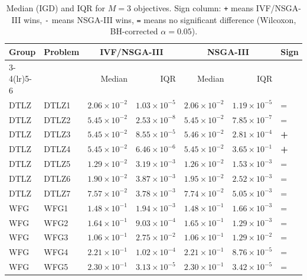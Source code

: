 \begin{table}[t]
\centering
\caption{Median (IGD) and IQR for $M=3$ objectives. Sign column: \texttt{+} means IVF/NSGA-III wins, \texttt{-} means NSGA-III wins, \texttt{=} means no significant difference (Wilcoxon, BH-corrected $\alpha=0.05$).}
\label{tab:igd_m3_ivfnsgaiii}
\scriptsize
\begin{tabular}{llrrrrl}
\toprule
Group & Problem & \multicolumn{2}{c}{IVF/NSGA-III} & \multicolumn{2}{c}{NSGA-III} & Sign \\
\cmidrule(lr){3-4}\cmidrule(lr){5-6}
 & & Median & IQR & Median & IQR & \\
\midrule
DTLZ & DTLZ1 & $2.06\!\times\!10^{-2}$ & $1.03\!\times\!10^{-5}$ & $2.06\!\times\!10^{-2}$ & $1.19\!\times\!10^{-5}$ & = \\
DTLZ & DTLZ2 & $5.45\!\times\!10^{-2}$ & $2.53\!\times\!10^{-8}$ & $5.45\!\times\!10^{-2}$ & $7.85\!\times\!10^{-7}$ & = \\
DTLZ & DTLZ3 & $5.45\!\times\!10^{-2}$ & $8.55\!\times\!10^{-5}$ & $5.46\!\times\!10^{-2}$ & $2.81\!\times\!10^{-4}$ & \textbf{+} \\
DTLZ & DTLZ4 & $5.45\!\times\!10^{-2}$ & $6.46\!\times\!10^{-6}$ & $5.45\!\times\!10^{-2}$ & $3.65\!\times\!10^{-1}$ & \textbf{+} \\
DTLZ & DTLZ5 & $1.29\!\times\!10^{-2}$ & $3.19\!\times\!10^{-3}$ & $1.26\!\times\!10^{-2}$ & $1.53\!\times\!10^{-3}$ & = \\
DTLZ & DTLZ6 & $1.90\!\times\!10^{-2}$ & $3.87\!\times\!10^{-3}$ & $1.95\!\times\!10^{-2}$ & $2.52\!\times\!10^{-3}$ & = \\
DTLZ & DTLZ7 & $7.57\!\times\!10^{-2}$ & $3.78\!\times\!10^{-3}$ & $7.74\!\times\!10^{-2}$ & $5.05\!\times\!10^{-3}$ & = \\
\addlinespace
WFG & WFG1 & $1.48\!\times\!10^{-1}$ & $1.94\!\times\!10^{-3}$ & $1.48\!\times\!10^{-1}$ & $1.66\!\times\!10^{-3}$ & = \\
WFG & WFG2 & $1.64\!\times\!10^{-1}$ & $9.03\!\times\!10^{-4}$ & $1.65\!\times\!10^{-1}$ & $1.29\!\times\!10^{-3}$ & = \\
WFG & WFG3 & $1.06\!\times\!10^{-1}$ & $2.75\!\times\!10^{-2}$ & $1.06\!\times\!10^{-1}$ & $1.29\!\times\!10^{-2}$ & = \\
WFG & WFG4 & $2.21\!\times\!10^{-1}$ & $1.02\!\times\!10^{-4}$ & $2.21\!\times\!10^{-1}$ & $8.76\!\times\!10^{-5}$ & = \\
WFG & WFG5 & $2.30\!\times\!10^{-1}$ & $3.13\!\times\!10^{-5}$ & $2.30\!\times\!10^{-1}$ & $3.42\!\times\!10^{-5}$ & = \\

\end{tabular}
\end{table}
